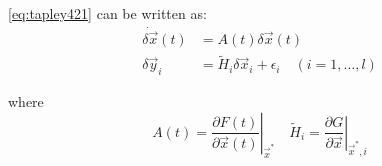\ref{eq:tapley421} can be written as:
\begin{equation}
\begin{aligned}
  \dot{\delta \vec{x}}(t) &= A(t) \delta \vec{x}(t) \\
  \delta \vec{y}_i &= \tilde{H}_i \delta \vec{x}_i + {\epsilon}_i \quad (i=1,\ldots,l)
\end{aligned}
\end{equation}

where
\begin{equation}
A(t) = \left.\frac{\partial F(t)}{\partial \vec{x} (t)}\right|_{\vec{x}^*} 
\quad
\tilde{H}_i = \left.\frac{\partial G}{\partial \vec{x}}\right|_{\vec{x}^* , i}
\end{equation}
